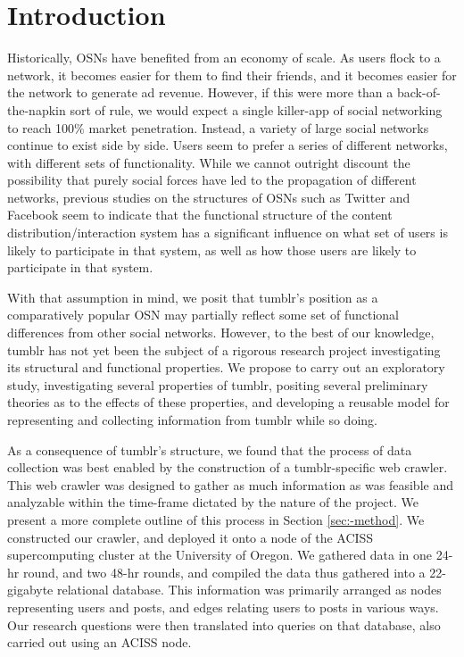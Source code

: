 \section{Introduction}
\label{sec:-intro}


Historically, OSNs have benefited from an economy of scale.  As users 
flock to a network, it becomes easier for them to find their friends, 
and it becomes easier for the network to generate ad revenue.  However, 
if this were more than a back-of-the-napkin sort of rule, we would 
expect a single killer-app of social networking to reach 100\% market 
penetration.  Instead, a variety of large social networks continue 
to exist side by side.  Users seem to prefer a series of different 
networks, with different sets of functionality.  While we cannot 
outright discount the possibility that purely social forces have led to the 
propagation of different networks, previous studies on the structures 
of OSNs such as Twitter\cite{kwak2010twitter} and Facebook\cite{brokencitation}
seem to indicate that the functional structure of the content 
distribution/interaction system has a significant influence on what set of 
users is likely to participate in that system, as well as how those users 
are likely to participate in that system.


With that assumption in mind, we posit that tumblr's position as a 
comparatively popular OSN may partially reflect some 
set of functional differences from other social networks.  However, to 
the best of our knowledge, tumblr has not yet been the subject of 
a rigorous research project investigating its structural 
and functional properties.  We propose to carry out an exploratory study, 
investigating several properties of tumblr, positing several preliminary 
theories as to the effects of these properties, and developing a reusable 
model for representing and collecting information from tumblr while so 
doing.

As a consequence of tumblr's structure, we found that the process of 
data collection was best enabled by the construction of a 
tumblr-specific web crawler.  This web crawler was designed to gather 
as much information as was feasible and analyzable within the time-frame 
dictated by the nature of the project.  We present a more complete 
outline of this process in Section \ref{sec:-method}.  We constructed 
our crawler, and deployed it onto a node of the ACISS supercomputing 
cluster at the University of Oregon.  We gathered data in one 24-hr 
round, and two 48-hr rounds, and compiled the data thus gathered into a 
22-gigabyte relational database.  This information was primarily arranged 
as nodes representing users and posts, and edges relating users to 
posts in various ways. Our research questions were then translated into 
queries on that database, also carried out using an ACISS node.

